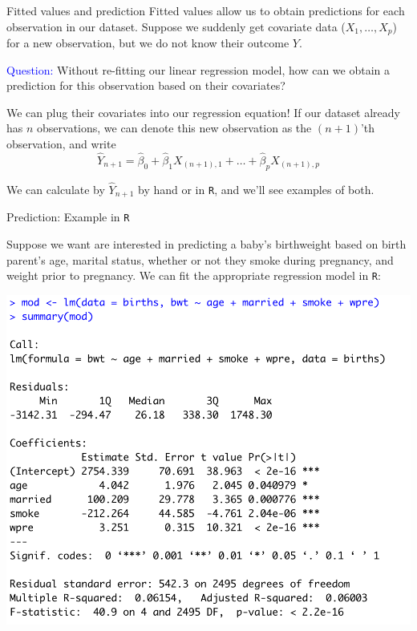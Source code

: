 \documentclass[10pt,t]{beamer}
\begin{document}
\begin{frame}{Fitted values and prediction}
Fitted values allow us to obtain predictions for each observation in our dataset. Suppose we suddenly get covariate data ($X_1, \dots, X_p$) for a new observation, but we do not know their outcome $Y$. 

\vspace{0.3cm} 

\textcolor{blue}{Question:} Without re-fitting our linear regression model, how can we obtain a prediction for this observation based on their covariates? \pause

\vspace{0.3cm}

We can plug their covariates into our regression equation! If our dataset already has $n$ observations, we can denote this new observation as the $(n + 1)$'th observation, and write
$$
\hat{Y}_{n + 1} = \hat{\beta}_0 + \hat{\beta}_1 X_{(n + 1), 1} + \dots + \hat{\beta}_p X_{(n + 1), p}
$$

We can calculate by $\hat{Y}_{n + 1}$ by hand or in \texttt{R}, and we'll see examples of both.

\end{frame}

\begin{frame}{Prediction: Example in \texttt{R}}

Suppose we want are interested in predicting a baby's birthweight based on birth parent's age, marital status, whether or not they smoke during pregnancy, and weight prior to pregnancy. We can fit the appropriate regression model in \texttt{R}:

\vspace{0.2cm}

\centering \includegraphics[scale=0.35]{predict_reg.png}
\end{frame}
\end{document}
